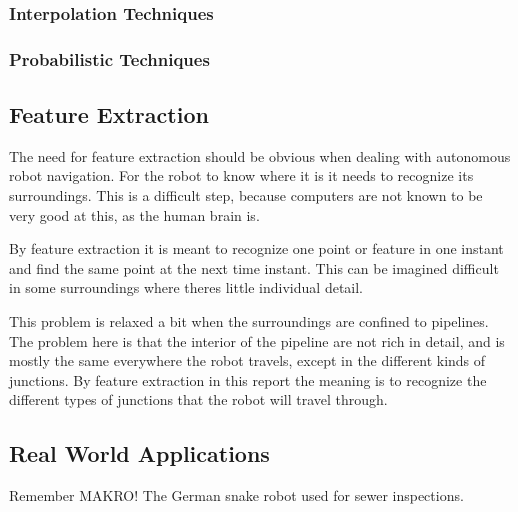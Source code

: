 \subsubsection{Interpolation Techniques}



\subsubsection{Probabilistic Techniques}


\subsection{Feature Extraction}
The need for feature extraction should be obvious when dealing with autonomous robot
navigation. For the robot to know where it is it needs to recognize its surroundings. This
is a difficult step, because computers are not known to be very good at this, as the human
brain is. 

By feature extraction it is meant to recognize one point or feature in one instant and
find the same point at the next time instant. This can be imagined difficult in some
surroundings where theres little individual detail. 

This problem is relaxed a bit when the surroundings are confined to pipelines. The problem
here is that the interior of the pipeline are not rich in detail, and is mostly the same
everywhere the robot travels, except in the different kinds of junctions. By feature
extraction in this report the meaning is to recognize the different types of junctions
that the robot will travel through. 

\cite{theilemann-breivik}


\subsection{Real World Applications}

Remember MAKRO! The German snake robot used for sewer inspections. 



